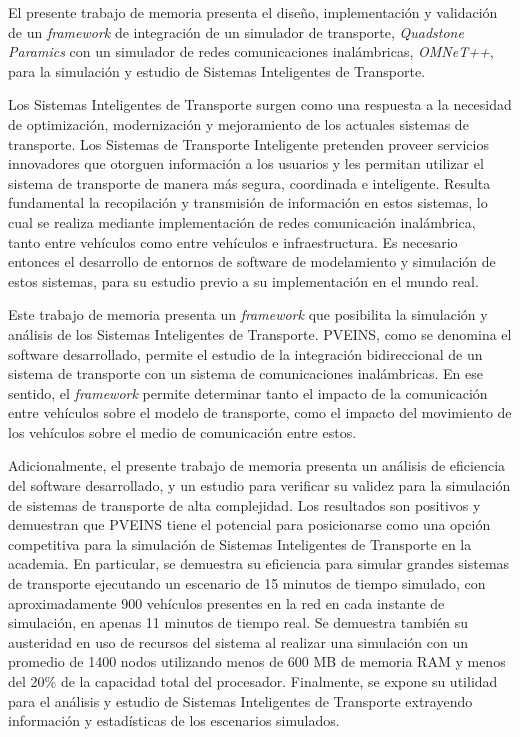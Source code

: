 El presente trabajo de memoria presenta el diseño, implementación y validación de un \emph{framework} de integración de un simulador de transporte, \emph{Quadstone Paramics} con un simulador de redes comunicaciones inalámbricas, \emph{OMNeT++}, para la simulación y estudio de Sistemas Inteligentes de Transporte.

Los Sistemas Inteligentes de Transporte surgen como una respuesta a la necesidad de optimización, modernización y mejoramiento de los actuales sistemas de transporte. Los Sistemas de Transporte Inteligente pretenden proveer servicios innovadores que otorguen información a los usuarios y les permitan utilizar el sistema de transporte de manera más segura, coordinada e inteligente. Resulta fundamental la recopilación y transmisión de información en estos sistemas, lo cual se realiza mediante implementación de redes comunicación inalámbrica, tanto entre vehículos como entre vehículos e infraestructura. Es necesario entonces el desarrollo de entornos de software de modelamiento y simulación de estos sistemas, para su estudio previo a su implementación en el mundo real.

Este trabajo de memoria presenta un \emph{framework} que posibilita la simulación y análisis de los Sistemas Inteligentes de Transporte. PVEINS, como se denomina el software desarrollado, permite el estudio de la integración bidireccional de un sistema de transporte con un sistema de comunicaciones inalámbricas. En ese sentido, el \emph{framework} permite determinar tanto el impacto de la comunicación entre vehículos sobre el modelo de transporte, como el impacto del movimiento de los vehículos sobre el medio de comunicación entre estos.

Adicionalmente, el presente trabajo de memoria presenta un análisis de eficiencia del software desarrollado, y un estudio para verificar su validez para la simulación de sistemas de transporte de alta complejidad. Los resultados son positivos y demuestran que PVEINS tiene el potencial para posicionarse como una opción competitiva para la simulación de Sistemas Inteligentes de Transporte en la academia. En particular, se demuestra su eficiencia para simular grandes sistemas de transporte ejecutando un escenario de 15 minutos de tiempo simulado, con aproximadamente 900 vehículos presentes en la red en cada instante de simulación, en apenas 11 minutos de tiempo real. Se demuestra también su austeridad en uso de recursos del sistema al realizar una simulación con un promedio de 1400 nodos utilizando menos de 600 MB de memoria RAM y menos del 20\% de la capacidad total del procesador. Finalmente, se expone su utilidad para el análisis y estudio de Sistemas Inteligentes de Transporte extrayendo información y estadísticas de los escenarios simulados.
